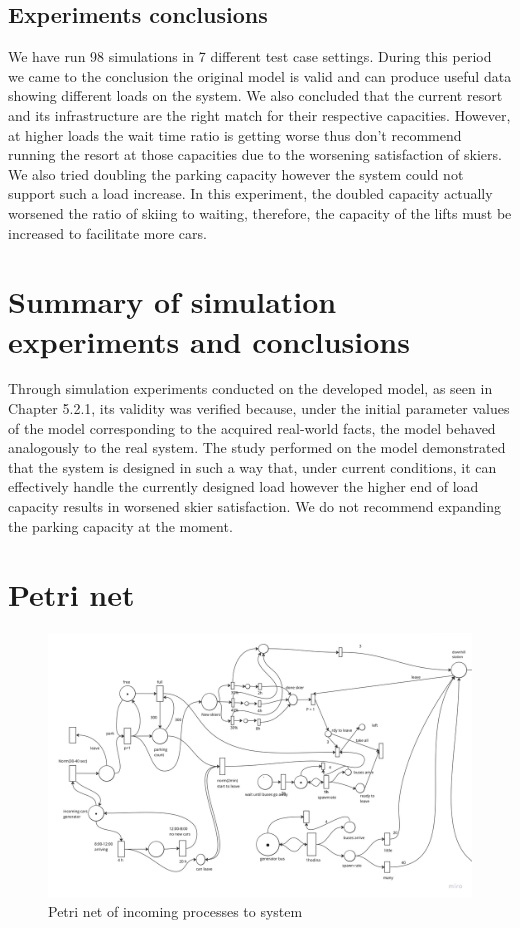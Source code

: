 \documentclass[11pt,a4paper]{article}
\begin{document}
\subsection{Experiments conclusions}
We have run 98 simulations in 7 different test case settings. During this period we came to the conclusion the original model is valid and can produce useful data showing different loads on the system. We also concluded that the current resort and its infrastructure are the right match for their respective capacities. However, at higher loads the wait time ratio is getting worse thus don't recommend running the resort at those capacities due to the worsening satisfaction of skiers.
We also tried doubling the parking capacity however the system could not support such a load increase. In this experiment, the doubled capacity actually worsened the ratio of skiing to waiting, therefore, the capacity of the lifts must be increased to facilitate more cars.


\section{Summary of simulation experiments and conclusions}

Through simulation experiments conducted on the developed model, as seen in Chapter 5.2.1, its validity was verified because, under the initial parameter values of the model corresponding to the acquired real-world facts, the model behaved analogously to the real system.
The study performed on the model demonstrated that the system is designed in such a way that, under current conditions, it can effectively handle the currently designed load however the higher end of load capacity results in worsened skier satisfaction. We do not recommend expanding the parking capacity at the moment.

\pagebreak




\clearpage
\appendix


\section{Petri net}
\label{appendix:petrinet}

\begin{figure}[H]
    \centering
    \includegraphics[width=0.85 \linewidth]{doc/petri-1.jpg}
    \caption{Petri net of incoming processes to system}
\end{figure}
\end{document}
